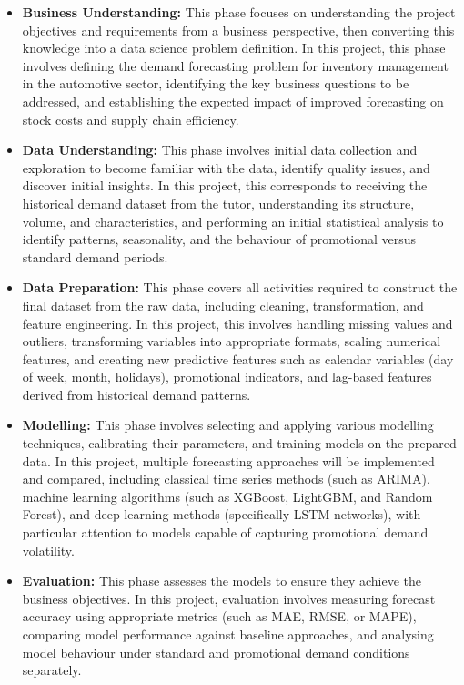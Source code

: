 \documentclass[ENG]{TFUOC}%
\begin{document}
\begin{itemize}
    \item \textbf{Business Understanding:} This phase focuses on 
    understanding the project objectives and requirements from a 
    business perspective, then converting this knowledge into a 
    data science problem definition. In this project, this phase 
    involves defining the demand forecasting problem for inventory 
    management in the automotive sector, identifying the key 
    business questions to be addressed, and establishing the 
    expected impact of improved forecasting on stock costs and 
    supply chain efficiency.

    \item \textbf{Data Understanding:} This phase involves initial 
    data collection and exploration to become familiar with the 
    data, identify quality issues, and discover initial insights. 
    In this project, this corresponds to receiving the historical 
    demand dataset from the tutor, understanding its structure, 
    volume, and characteristics, and performing an initial 
    statistical analysis to identify patterns, seasonality, and 
    the behaviour of promotional versus standard demand periods.

    \item \textbf{Data Preparation:} This phase covers all 
    activities required to construct the final dataset from the 
    raw data, including cleaning, transformation, and feature 
    engineering. In this project, this involves handling missing 
    values and outliers, transforming variables into appropriate 
    formats, scaling numerical features, and creating new 
    predictive features such as calendar variables (day of week, 
    month, holidays), promotional indicators, and lag-based 
    features derived from historical demand patterns.

    \item \textbf{Modelling:} This phase involves selecting and 
    applying various modelling techniques, calibrating their 
    parameters, and training models on the prepared data. In this 
    project, multiple forecasting approaches will be implemented and compared, including classical time series methods (such as ARIMA), machine learning algorithms (such as XGBoost, LightGBM, and Random Forest), and deep learning methods (specifically LSTM networks), with particular 
    attention to models capable of capturing promotional demand 
    volatility.

    \item \textbf{Evaluation:} This phase assesses the models to 
    ensure they achieve the business objectives. In this project, 
    evaluation involves measuring forecast accuracy using 
    appropriate metrics (such as MAE, RMSE, or MAPE), comparing 
    model performance against baseline approaches, and analysing 
    model behaviour under standard and promotional demand 
    conditions separately.


\end{itemize}
\end{document}
